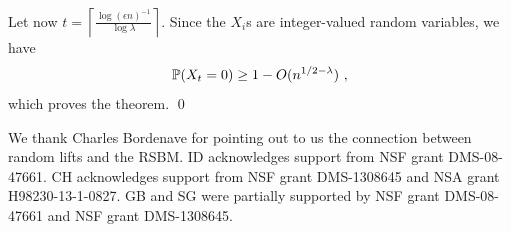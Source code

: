 \documentclass[11pt,reqno]{amsart}
\begin{document}
Let now $t=\left\lceil \frac{\log(\epsilon n)^{-1}}{\log{\lambda}}
\right\rceil$. 
 Since the $X_i$s  are integer-valued random variables, we have
\[
\P(X_t=0)\geq 1-O(n^{1/2-\lambda})~,
\] 
which proves the theorem.
\qed



We thank Charles Bordenave for pointing out to us the connection between random lifts and the RSBM. ID acknowledges support from NSF grant DMS-08-47661. CH acknowledges support from NSF grant DMS-1308645 and NSA grant H98230-13-1-0827. GB and SG were partially supported by NSF grant DMS-08-47661 and NSF grant DMS-1308645.

\nocite{}
{}

\end{document}
